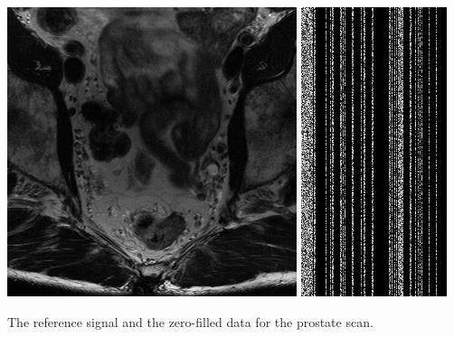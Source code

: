 \begin{sidefigure}
	\centering
	\includegraphics[width=\marginparwidth]{scripts/ood/prostate/reference-rss}
	\includegraphics[width=.5\marginparwidth]{scripts/ood/prostate/log-abs-data}
	\caption[Reference signal the zero-filled data for the prostate scan]{The reference signal and the zero-filled data for the prostate scan.}%
	\label{fig:prostate reference}
\end{sidefigure}

